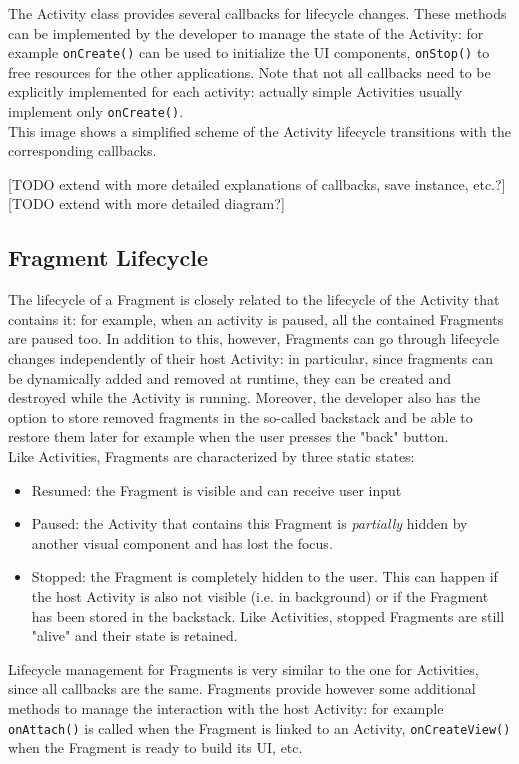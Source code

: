 \documentclass[11pt,a4paper,notitlepage]{article}
\begin{document}
The Activity class provides several callbacks for lifecycle changes. These methods can be implemented by the developer to manage the state of the Activity: for example \texttt{onCreate()} can be used to initialize the UI components, \texttt{onStop()} to free resources for the other applications. Note that not all callbacks need to be explicitly implemented for each activity: actually simple Activities usually implement only \texttt{onCreate()}.\bigskip \\

This image shows a simplified scheme of the Activity lifecycle transitions with the corresponding callbacks.

[TODO extend with more detailed explanations of callbacks, save instance, etc.?]
[TODO extend with more detailed diagram?]

\subsection{Fragment Lifecycle}
The lifecycle of a Fragment is closely related to the lifecycle of the Activity that contains it: for example, when an activity is paused, all the contained Fragments are paused too. In addition to this, however, Fragments can go through lifecycle changes independently of their host Activity: in particular, since fragments can be dynamically added and removed at runtime, they can be created and destroyed while the Activity is running. Moreover, the developer also has the option to store removed fragments in the so-called backstack and be able to restore them later for example when the user presses the "back" button.\smallskip \\
Like Activities, Fragments are characterized by three static states:
\begin{itemize}
	\item Resumed: the Fragment is visible and can receive user input
	\item Paused: the Activity that contains this Fragment is \textit{partially} hidden by another visual component and has lost the focus.
	\item Stopped: the Fragment is completely hidden to the user. This can happen if the host Activity is also not visible (i.e. in background) or if the Fragment has been stored in the backstack. Like Activities, stopped Fragments are still "alive" and their state is retained.
\end{itemize}
Lifecycle management for Fragments is very similar to the one for Activities, since all callbacks are the same. Fragments provide however some additional methods to manage the interaction with the host Activity: for example \texttt{onAttach()} is called when the Fragment is linked to an Activity, \texttt{onCreateView()} when the Fragment is ready to build its UI, etc.
\end{document}
